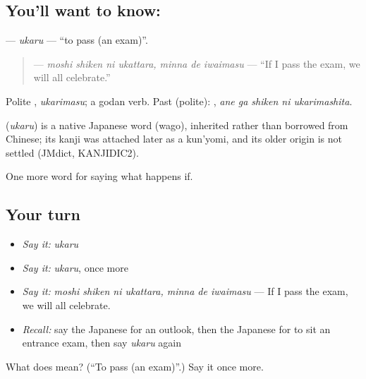\subsection*{You'll want to know: }
\textbf{} — \emph{ukaru} — \textquotedblleft{}to pass (an exam)\textquotedblright{}.

\begin{quote}
\textbf{   } — \emph{moshi shiken ni ukattara, minna de iwaimasu} — \textquotedblleft{}If I pass the exam, we will all celebrate.\textquotedblright{}
\end{quote}

Polite \textbf{}, \emph{ukarimasu}; a godan verb. Past (polite): \textbf{  }, \emph{ane ga shiken ni ukarimashita}.

\begin{cousinweb}
\textbf{} (\emph{ukaru}) is a native Japanese word (wago), inherited rather than borrowed from Chinese; its kanji was attached later as a kun'yomi, and its older origin is not settled (JMdict, KANJIDIC2).
\end{cousinweb}

\begin{grammarlens}[title={What you've built}]
One more word for saying what happens if.
\end{grammarlens}

\subsection*{Your turn}
\begin{itemize}
\raggedright
  \item \emph{Say it:} \emph{ukaru}
  \item \emph{Say it:} \emph{ukaru}, once more
  \item \emph{Say it:} \emph{moshi shiken ni ukattara, minna de iwaimasu} — If I pass the exam, we will all celebrate.
  \item \emph{Recall:} say the Japanese for an outlook, then the Japanese for to sit an entrance exam, then say \emph{ukaru} again
\end{itemize}

\begin{tcolorbox}[breakable,colback=teal!4,colframe=teal!35!black,title={Before you move on}]
What does  mean? (\textquotedblleft{}To pass (an exam)\textquotedblright{}.) Say it once more.
\end{tcolorbox}

